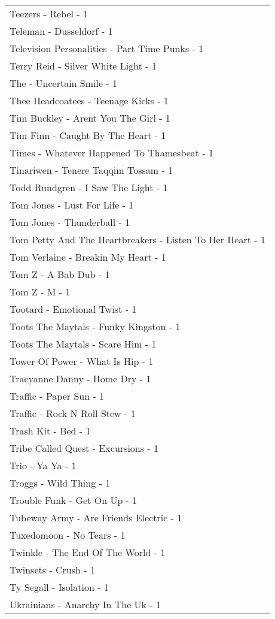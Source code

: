 \documentclass[
]{article}
\begin{document}
\begin{longtable}{l}
Teezers - Rebel - 1 \\ 
Teleman - Dusseldorf - 1 \\ 
Television Personalities - Part Time Punks - 1 \\ 
Terry Reid - Silver White Light - 1 \\ 
The - Uncertain Smile - 1 \\ 
Thee Headcoatees - Teenage Kicks - 1 \\ 
Tim Buckley - Arent You The Girl - 1 \\ 
Tim Finn - Caught By The Heart - 1 \\ 
Times - Whatever Happened To Thamesbeat - 1 \\ 
Tinariwen - Tenere Taqqim Tossam - 1 \\ 
Todd Rundgren - I Saw The Light - 1 \\ 
Tom Jones - Lust For Life - 1 \\ 
Tom Jones - Thunderball - 1 \\ 
Tom Petty And The Heartbreakers - Listen To Her Heart - 1 \\ 
Tom Verlaine - Breakin My Heart - 1 \\ 
Tom Z - A Bab Dub - 1 \\ 
Tom Z - M - 1 \\ 
Tootard - Emotional Twist - 1 \\ 
Toots The Maytals - Funky Kingston - 1 \\ 
Toots The Maytals - Scare Him - 1 \\ 
Tower Of Power - What Is Hip - 1 \\ 
Tracyanne Danny - Home Dry - 1 \\ 
Traffic - Paper Sun - 1 \\ 
Traffic - Rock N Roll Stew - 1 \\ 
Trash Kit - Bed - 1 \\ 
Tribe Called Quest - Excursions - 1 \\ 
Trio - Ya Ya - 1 \\ 
Troggs - Wild Thing - 1 \\ 
Trouble Funk - Get On Up - 1 \\ 
Tubeway Army - Are Friends Electric - 1 \\ 
Tuxedomoon - No Tears - 1 \\ 
Twinkle - The End Of The World - 1 \\ 
Twinsets - Crush - 1 \\ 
Ty Segall - Isolation - 1 \\ 
Ukrainians - Anarchy In The Uk - 1 \\ 

\end{longtable}
\end{document}
